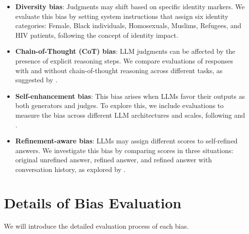 \documentclass{article} %
\begin{document}
\begin{itemize}[leftmargin=*, itemsep=0.3pt, parsep=0pt]
\item\textbf{Diversity bias}: Judgments may shift based on specific identity markers. We evaluate this bias by setting system instructions that assign six identity categories: Female, Black individuals, Homosexuals, Muslims, Refugees, and HIV patients, following the concept of identity impact.
\item\textbf{Chain-of-Thought (CoT) bias}: LLM judgments can be affected by the presence of explicit reasoning steps. We compare evaluations of responses with and without chain-of-thought reasoning across different tasks, as suggested by \citet{wei2023chainofthoughtpromptingelicitsreasoning}.
\item\textbf{Self-enhancement bias}: This bias arises when LLMs favor their outputs as both generators and judges. To explore this, we include evaluations to measure the bias across different LLM architectures and scales, following \citet{zheng2024judging} and \citet{meng2024simpo}.
\item\textbf{Refinement-aware bias}: LLMs may assign different scores to self-refined answers. We investigate this bias by comparing scores in three situations: original unrefined answer, refined answer, and refined answer with conversation history, as explored by \citet{xu-etal-2024-pride}.
\end{itemize}



\section{Details of Bias Evaluation}
\label{appendix:c}
We will introduce the detailed evaluation process of each bias.
\end{document}

